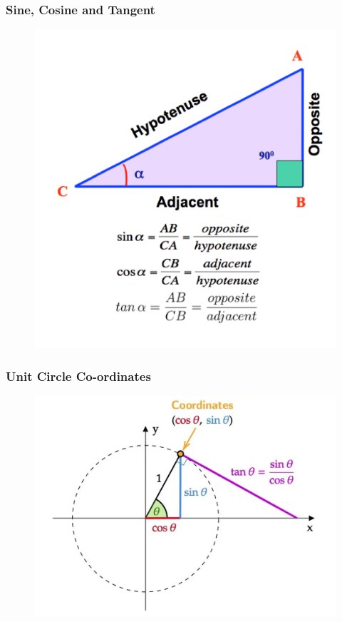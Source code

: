 \documentclass{beamer}
\begin{document}
\begin{frame}
    \frametitle{Sine, Cosine and Tangent}
    \begin{figure}[h]    
        \begin{minipage}[b]{0.8\textwidth}
        \centering
        \includegraphics[scale=0.22]{sine-cosine-tangent.png}
    \end{minipage}
\end{figure}
\end{frame}

\begin{frame}
    \frametitle{Unit Circle Co-ordinates}
    \begin{figure}[h]    
        \begin{minipage}[b]{0.8\textwidth}
        \centering
        \includegraphics[scale=0.22]{8.png}
    \end{minipage}
\end{figure}
\end{frame}
\end{document}
